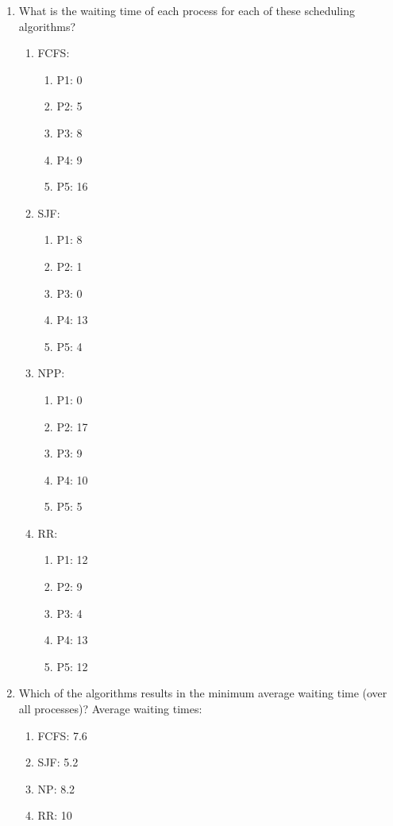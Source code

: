 \documentclass{amsart}
\begin{document}
\begin{enumerate}
\begin{enumerate}
                \item What is the waiting time of each process for each of these scheduling algorithms?
                    \begin{enumerate}
                    \item FCFS: \begin{enumerate}
                        \item P1: 0
                        \item P2: 5
                        \item P3: 8
                        \item P4: 9
                        \item P5: 16
                    \end{enumerate}
                    \item SJF: \begin{enumerate}
                        \item P1: 8
                        \item P2: 1
                        \item P3: 0
                        \item P4: 13
                        \item P5: 4
                    \end{enumerate}
                    \item NPP: \begin{enumerate}
                        \item P1: 0
                        \item P2: 17
                        \item P3: 9
                        \item P4: 10
                        \item P5: 5
                    \end{enumerate}
                    \item RR: \begin{enumerate}
                        \item P1: 12
                        \item P2: 9
                        \item P3: 4
                        \item P4: 13
                        \item P5: 12
                    \end{enumerate}
                \end{enumerate}
                \item Which of the algorithms results in the minimum average waiting time (over all processes)?
                    Average waiting times: \begin{enumerate}
                        \item FCFS: 7.6
                        \item SJF: 5.2
                        \item NP: 8.2
                        \item RR: 10
                    \end{enumerate}


\end{enumerate}
\end{enumerate}
\end{document}

